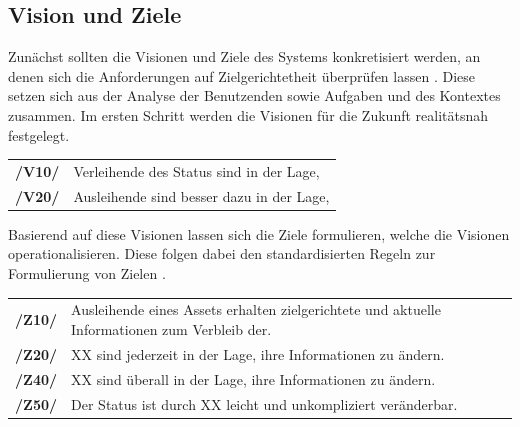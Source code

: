 \subsection*{Vision und Ziele}
\label{section:visionziel}
Zunächst sollten die Visionen und Ziele des Systems konkretisiert werden, an denen sich die
Anforderungen auf Zielgerichtetheit überprüfen lassen \cite{balzert2009}. Diese setzen sich aus der
Analyse der Benutzenden sowie Aufgaben und des Kontextes zusammen. Im ersten Schritt werden die
Visionen für die Zukunft realitätsnah festgelegt.



\begin{center}
        \renewcommand{\arraystretch}{1.5}
        \begin{tabular}{p{}p{}}
                \hline
                \textbf{/V10/} & Verleihende des Status sind in der Lage,                                          \\
                \textbf{/V20/} & Ausleihende sind besser dazu in der Lage,                                         \\
                \hline
        \end{tabular}
\end{center}

Basierend auf diese Visionen lassen sich die Ziele formulieren, welche die Visionen
operationalisieren. Diese folgen dabei den standardisierten Regeln zur Formulierung von Zielen
\cite{pohl_requirements_2008}.


\begin{center}
        \renewcommand{\arraystretch}{1.5}
        \begin{tabular}{p{}p{}}
                \hline
                \textbf{/Z10/} & Ausleihende eines Assets erhalten zielgerichtete und aktuelle
                Informationen zum Verbleib der.                                                                          \\
                \textbf{/Z20/} & XX sind jederzeit in der Lage, ihre Informationen zu ändern.                                       \\
                \textbf{/Z40/} & XX sind überall in der Lage, ihre Informationen zu ändern.                                         \\
                \textbf{/Z50/} & Der Status ist durch XX leicht und unkompliziert veränderbar.                                      \\
                \hline
        \end{tabular}
\end{center}

